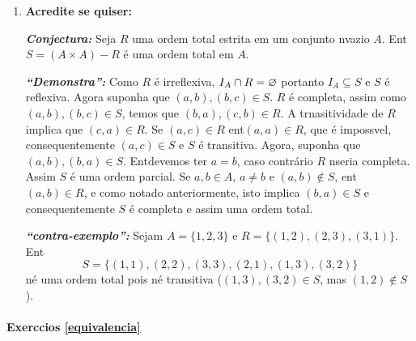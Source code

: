 \begin{enumerate}[{\bf 1.}]
\item {\bf Acredite se quiser:}  

\noindent \textit{\textbf{Conjectura:}} Seja $R$ uma ordem total estrita em um conjunto n\ao vazio $A$. Ent\ao $S=(A\times A)-R$ \'e uma ordem total em $A$. 

\noindent \textit{\textbf{``Demonstra\caoi'':}} Como $R$ \'e irreflexiva, $I_A\cap R=\varnothing$ portanto $I_A\subseteq S$ e $S$ \'e reflexiva. Agora suponha que $(a,b),(b,c)\in S$. $R$ \'e completa, assim como $(a,b),(b,c)\in S$, temos que $(b,a),(c,b)\in R$. A trnasitividade de $R$ implica que $(c,a)\in R$. Se $(a,c)\in R$ ent\ao $(a,a)\in R$, que \'e imposs\ih vel, consequentemente $(a,c)\in S$ e $S$ \'e transitiva. Agora, suponha que $(a,b),(b,a)\in S$. Ent\ao devemos ter $a=b$, caso contr\'ario $R$ n\ao seria completa. Assim $S$ \'e uma ordem parcial. Se $a,b\in A$, $a\neq b$ e $(a,b)\notin S$, ent\ao $(a,b)\in R$, e como notado anteriormente, isto implica $(b,a)\in S$ e consequentemente $S$ \'e completa e assim uma ordem total.

\noindent \textit{\textbf{``contra-exemplo'':}} Sejam $A=\{1,2,3\}$ e $R=\{(1,2),(2,3),(3,1)\}$. Ent\ao
\[
S=\{(1,1),(2,2),(3,3),(2,1),(1,3),(3,2)\}
\]
n\ao \'e uma ordem total pois n\ao \'e transitiva ($(1,3),(3,2)\in S$, mas $(1,2)\notin S$).
\end{enumerate}
\paragraph{Exerc\ih cios \ref{equivalencia}}

